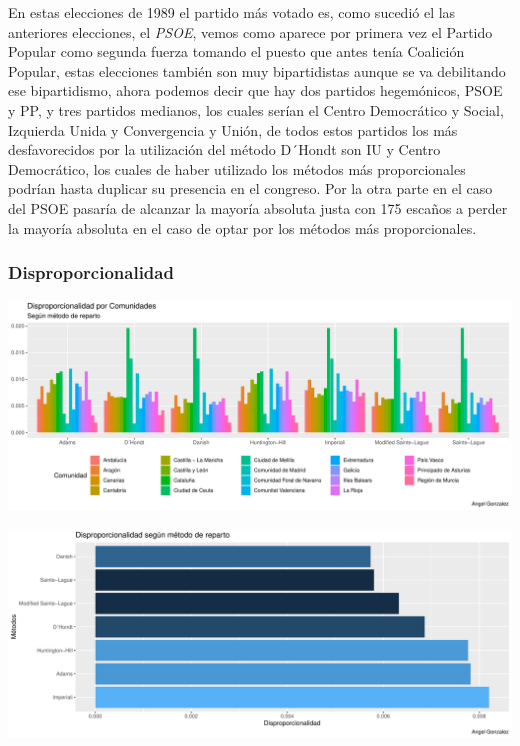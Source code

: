 \documentclass[12pt,a4paper,]{book}
\numberwithin{dummy}{section}
\theoremstyle{ocrenumbox}
\theoremstyle{blacknumex}
\theoremstyle{blacknumbox}
\theoremstyle{ocrenum}
\theoremstyle{ocrenum}
\begin{document}
En estas elecciones de 1989 el partido más votado es, como sucedió el
las anteriores elecciones, el \emph{PSOE}, vemos como aparece por
primera vez el Partido Popular como segunda fuerza tomando el puesto que
antes tenía Coalición Popular, estas elecciones también son muy
bipartidistas aunque se va debilitando ese bipartidismo, ahora podemos
decir que hay dos partidos hegemónicos, PSOE y PP, y tres partidos
medianos, los cuales serían el Centro Democrático y Social, Izquierda
Unida y Convergencia y Unión, de todos estos partidos los más
desfavorecidos por la utilización del método D´Hondt son IU y Centro
Democrático, los cuales de haber utilizado los métodos más
proporcionales podrían hasta duplicar su presencia en el congreso. Por
la otra parte en el caso del PSOE pasaría de alcanzar la mayoría
absoluta justa con 175 escaños a perder la mayoría absoluta en el caso
de optar por los métodos más proporcionales.

\hypertarget{disproporcionalidad-4}{%
\subsubsection{Disproporcionalidad}\label{disproporcionalidad-4}}

\begin{center}\includegraphics[width=0.95\linewidth]{figurasR/unnamed-chunk-96-1} \end{center}

\begin{center}\includegraphics[width=0.95\linewidth]{figurasR/unnamed-chunk-96-2} \end{center}
\end{document}
